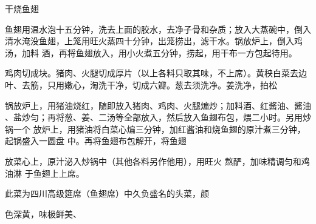 \begin{recipe}{干烧鱼翅}

\ingredients


\cooking

\step 鱼翅用温水泡十五分钟，洗去上面的胶水，去净子骨和杂质；放入大蒸碗中，倒入
清水淹没鱼翅，上笼用旺火蒸四十分钟，出笼捞出，滤干水。锅放炉上，倒入鸡汤，加料
酒，再将鱼翅放入，用小火煮五分钟，捞起，用干布一方包起待用。

\step 鸡肉切成块。猪肉、火腿切成厚片（以上各料只取其味，不上席）。黄秧白菜去边
叶、去筋，只用嫩心，淘洗干净，切成六瓣。葱去须洗净。姜洗净，拍松

\step 锅放炉上，用猪油烧红，随即放入猪肉、鸡肉、火腿煸炒；加料酒、红酱油、酱油
、盐炒匀；再将葱、姜、二汤等全部放入，然后放入鱼翅布包，煨二小时。另用炒锅一个
放炉上，用猪油将白菜心煸三分钟，加红酱油和烧鱼翅的原汁煮三分钟，起锅盛入一圆盘
中。再将鱼翅布包解开，将鱼翅

放菜心上，原汁泌入炒锅中（其他各料另作他用），用旺火 熬酽，加味精调匀和鸡油淋
于鱼翅上上席。

\features

此菜为四川高级筵席（鱼翅席）中久负盛名的头菜，颜

色深黄，味极鲜美、

\end{recipe}

